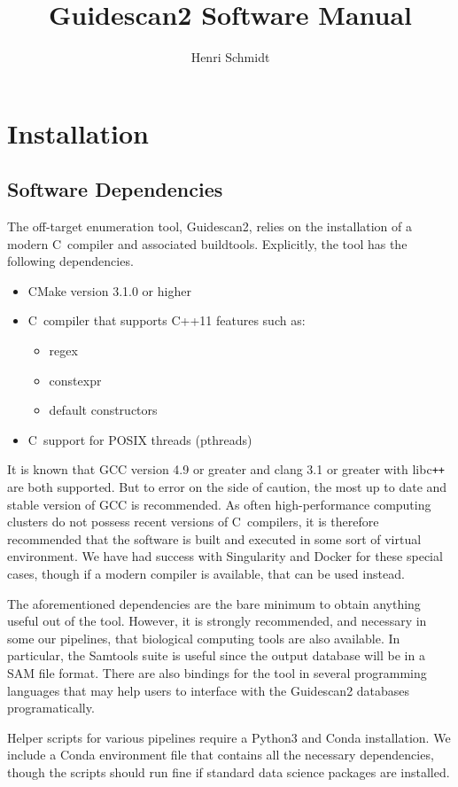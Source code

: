 \documentclass[11pt]{article}
\author{Henri Schmidt}
\title{Guidescan2 Software Manual}
\newcommand{\CC}{C\nolinebreak\hspace{-.05em}\raisebox{.4ex}{\tiny\bf
    +}\nolinebreak\hspace{-.10em}\raisebox{.4ex}{\tiny\bf +}}
\def\CC{{C\nolinebreak[4]\hspace{-.05em}\raisebox{.4ex}{\tiny\bf ++}}}
\begin{document}
\maketitle
\tableofcontents
\newpage

\section{Installation}
\subsection{Software Dependencies}
The off-target enumeration tool, Guidescan2, relies on the
installation of a modern \CC\ compiler and associated
buildtools. Explicitly, the tool has the following dependencies.
\begin{itemize}
\item CMake version 3.1.0 or higher
\item \CC\ compiler that supports C++11 features such as:
  \begin{itemize}
  \item regex
  \item constexpr
  \item default constructors
  \end{itemize}
\item \CC\ support for POSIX threads (pthreads) 
\end{itemize}
It is known that GCC version 4.9 or greater and clang 3.1 or greater
with libc\texttt{++} are both supported. But to error on the side of caution,
the most up to date and stable version of GCC is recommended. As often
high-performance computing clusters do not possess recent versions of
\CC\ compilers, it is therefore recommended that the software is built
and executed in some sort of virtual environment. We have had success
with Singularity and Docker for these special cases, though if a
modern compiler is available, that can be used instead.

The aforementioned dependencies are the bare minimum to obtain
anything useful out of the tool. However, it is strongly recommended,
and necessary in some our pipelines, that biological computing tools
are also available. In particular, the Samtools suite is useful since
the output database will be in a SAM file format. There are also
bindings for the tool in several programming languages that may help
users to interface with the Guidescan2 databases programatically.

Helper scripts for various pipelines require a Python3 and Conda
installation. We include a Conda environment file that contains all
the necessary dependencies, though the scripts should run fine if
standard data science packages are installed. 
\end{document}
